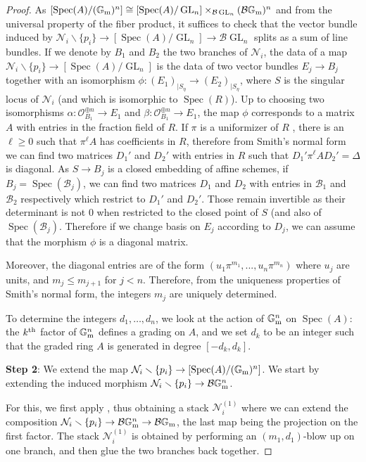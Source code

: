 \documentclass{amsart}
\newcommand{\bG}{\mathbb{G}}
\newcommand{\cB}{\mathcal{B}}
\newcommand{\cN}{\mathcal{N}}
\newcommand{\cO}{\mathcal{O}}
\newcommand{\spec}{\operatorname{Spec}}
\newcommand{\Gm}{\bG_{{\rm m}}}
\newcommand{\GL}{\operatorname{GL}}
\theoremstyle{definition}
\begin{document}
\begin{proof}
As $[\spec(A)/(\Gm)^n]\cong [\spec(A)/\GL_n]\times_{\cB\GL_n} (\cB\Gm)^n$ and from the universal property of the fiber product, it suffices to check that the vector bundle induced by $\cN_i\smallsetminus\{p_i\}\to [\spec(A)/\GL_n]\to \cB\GL_n$ splits as a sum of line bundles. If we denote by $B_1$ and $B_2$ the two branches of $\cN_i$, the data of a map $\cN_i\smallsetminus\{p_i\}\to [\spec(A)/\GL_n]$ is the data of two vector bundles $E_j\to B_j$ together with an isomorphism $\phi:(E_1)_{|S_\eta}\to(E_2)_{|S_\eta} $, where $S$ is the singular locus of $\cN_i$ (and which is isomorphic to $\spec(R)$).
Up to choosing two isomorphisms $\alpha:\cO_{B_1}^{\oplus n}\to E_1$ and $\beta:\cO_{B_1}^{\oplus n}\to E_1$, the map $\phi$ corresponds to a matrix $A$ with entries in the fraction
field of $R$. If $\pi$ is a uniformizer of $R$ , there is an $\ell\ge 0$ such that $\pi^\ell A$ has coefficients in $R$, therefore from Smith's normal form we can find two matrices $D_1'$ and $D_2'$ with entries in $R$ such that $D_1'\pi^\ell AD_2'=\Delta$ is diagonal.
As $S\to B_j$ is a closed embedding of affine schemes, if $B_j = \spec(\cB_j)$, we can find two matrices $D_1$ and $D_2$ with entries in $\cB_1$ and $\cB_2$ respectively which restrict to $D_1'$ and $D_2'$. Those remain invertible as their determinant is not 0 when restricted to the closed point of $S$ (and also of $\spec(\cB_j)$. Therefore if we change basis on $E_j$ according to $D_j$, we can assume that the morphism $\phi$ is a diagonal matrix.

Moreover, the diagonal entries are of the form $(u_1 \pi^{m_1},...,u_n\pi^{m_n})$ where $u_j$ are units, and
    $m_j\le m_{j+1}$ for $j<n$.
Therefore, from the uniqueness properties of Smith's normal form, the integers $m_j$ are uniquely determined.

To determine the integers $d_1,\ldots,d_n$, we look at the action of $\Gm^n$ on $\spec(A)$: the $k^{\rm th}$ factor of $\Gm^n$ defines a grading on $A$, and we set $d_k$ to be an integer such that the graded ring $A$ is generated in degree $[-d_k,d_k]$.

\textbf{Step 2}: We extend the map $\cN_i\smallsetminus\{p_i\}\to [\spec(A)/(\Gm)^n]$. We start by extending the induced morphism $\cN_i\smallsetminus\{p_i\}\to \cB\Gm^n$. 

For this, we first apply , thus obtaining a stack $\cN_i^{(1)}$ where we can extend the composition $\cN_i\smallsetminus\{p_i\}\to \cB\Gm^n\to \cB\Gm$, the last map being the projection on the first factor. The stack $\cN_i^{(1)}$ is obtained by performing an $(m_1,d_1)$-blow up on one branch, and then glue the two branches back together.


\end{proof}
\end{document}
